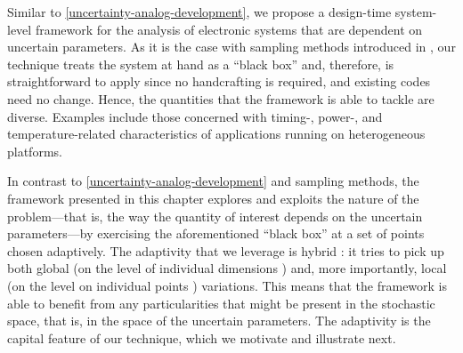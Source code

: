 Similar to \cref{uncertainty-analog-development}, we propose a design-time
system-level framework for the analysis of electronic systems that are dependent
on uncertain parameters. As it is the case with sampling methods introduced in
, our technique treats the system at hand as a ``black box'' and,
therefore, is straightforward to apply since no handcrafting is required, and
existing codes need no change. Hence, the quantities that the framework is able
to tackle are diverse. Examples include those concerned with timing-, power-,
and temperature-related characteristics of applications running on heterogeneous
platforms.

In contrast to \cref{uncertainty-analog-development} and sampling methods, the
framework presented in this chapter explores and exploits the nature of the
problem---that is, the way the quantity of interest depends on the uncertain
parameters---by exercising the aforementioned ``black box'' at a set of points
chosen adaptively. The adaptivity that we leverage is hybrid \cite{jakeman2012}:
it tries to pick up both global (on the level of individual dimensions
\cite{klimke2006}) and, more importantly, local (on the level on individual
points \cite{ma2009}) variations. This means that the framework is able to
benefit from any particularities that might be present in the stochastic space,
that is, in the space of the uncertain parameters. The adaptivity is the capital
feature of our technique, which we motivate and illustrate next.
